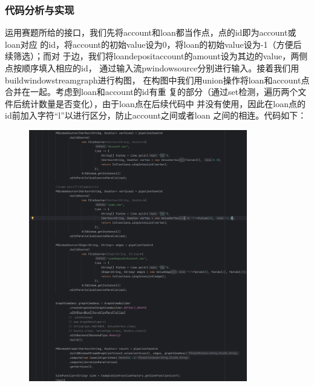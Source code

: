\subsubsection{代码分析与实现}
运用赛题所给的接口，我们先将account和loan都当作点，点的id即为account或loan对应
的id，将account的初始value设为0，将loan的初始value设为-1（方便后续筛选）；而对
于边，我们将loandepositaccount的amount设为其边的value，两侧点按顺序填入相应的id，
通过输入流pwindowsource分别进行输入。接着我们用buildwindowstreamgraph进行构图，
在构图中我们用union操作将loan和account点合并在一起。考虑到loan和account的id有重
复的部分（通过set检测，遍历两个文件后统计数量是否变化），由于loan点在后续代码中
并没有使用，因此在loan点的id前加入字符“l”以进行区分，防止account之间或者loan
之间的相连。代码如下：
\begin{figure}[H]
  \begin{center}
    \includegraphics[width=0.85\textwidth,scale=0.7]{./figures/pro4/1.png}
  \end{center}
\end{figure}

